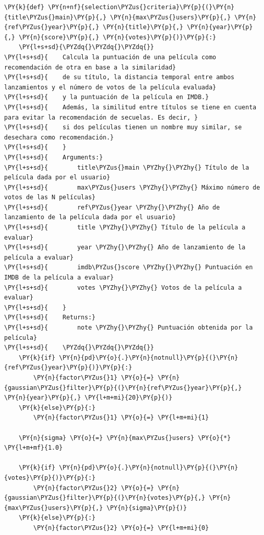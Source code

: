     \begin{tcolorbox}[breakable, size=fbox, boxrule=1pt, pad at break*=1mm,colback=cellbackground, colframe=cellborder]
\begin{Verbatim}[commandchars=\\\{\}]
\PY{k}{def} \PY{n+nf}{selection\PYZus{}criteria}\PY{p}{(}\PY{n}{title\PYZus{}main}\PY{p}{,} \PY{n}{max\PYZus{}users}\PY{p}{,} \PY{n}{ref\PYZus{}year}\PY{p}{,} \PY{n}{title}\PY{p}{,} \PY{n}{year}\PY{p}{,} \PY{n}{score}\PY{p}{,} \PY{n}{votes}\PY{p}{)}\PY{p}{:}
    \PY{l+s+sd}{\PYZdq{}\PYZdq{}\PYZdq{}}
\PY{l+s+sd}{    Calcula la puntuación de una película como recomendación de otra en base a la similaridad}
\PY{l+s+sd}{    de su título, la distancia temporal entre ambos lanzamientos y el número de votos de la película evaluada}
\PY{l+s+sd}{    y la puntuación de la película en IMDB.}
\PY{l+s+sd}{    Además, la similitud entre títulos se tiene en cuenta para evitar la recomendación de secuelas. Es decir, }
\PY{l+s+sd}{    si dos películas tienen un nombre muy similar, se desechara como recomendación.}
\PY{l+s+sd}{    }
\PY{l+s+sd}{    Arguments:}
\PY{l+s+sd}{        title\PYZus{}main \PYZhy{}\PYZhy{} Título de la película dada por el usuario}
\PY{l+s+sd}{        max\PYZus{}users \PYZhy{}\PYZhy{} Máximo número de votos de las N películas}
\PY{l+s+sd}{        ref\PYZus{}year \PYZhy{}\PYZhy{} Año de lanzamiento de la película dada por el usuario}
\PY{l+s+sd}{        title \PYZhy{}\PYZhy{} Título de la película a evaluar}
\PY{l+s+sd}{        year \PYZhy{}\PYZhy{} Año de lanzamiento de la película a evaluar}
\PY{l+s+sd}{        imdb\PYZus{}score \PYZhy{}\PYZhy{} Puntuación en IMDB de la película a evaluar}
\PY{l+s+sd}{        votes \PYZhy{}\PYZhy{} Votos de la película a evaluar}
\PY{l+s+sd}{    }
\PY{l+s+sd}{    Returns:}
\PY{l+s+sd}{        note \PYZhy{}\PYZhy{} Puntuación obtenida por la película}
\PY{l+s+sd}{    \PYZdq{}\PYZdq{}\PYZdq{}}
    \PY{k}{if} \PY{n}{pd}\PY{o}{.}\PY{n}{notnull}\PY{p}{(}\PY{n}{ref\PYZus{}year}\PY{p}{)}\PY{p}{:}
        \PY{n}{factor\PYZus{}1} \PY{o}{=} \PY{n}{gaussian\PYZus{}filter}\PY{p}{(}\PY{n}{ref\PYZus{}year}\PY{p}{,} \PY{n}{year}\PY{p}{,} \PY{l+m+mi}{20}\PY{p}{)}
    \PY{k}{else}\PY{p}{:}
        \PY{n}{factor\PYZus{}1} \PY{o}{=} \PY{l+m+mi}{1}        

    \PY{n}{sigma} \PY{o}{=} \PY{n}{max\PYZus{}users} \PY{o}{*} \PY{l+m+mf}{1.0}

    \PY{k}{if} \PY{n}{pd}\PY{o}{.}\PY{n}{notnull}\PY{p}{(}\PY{n}{votes}\PY{p}{)}\PY{p}{:}
        \PY{n}{factor\PYZus{}2} \PY{o}{=} \PY{n}{gaussian\PYZus{}filter}\PY{p}{(}\PY{n}{votes}\PY{p}{,} \PY{n}{max\PYZus{}users}\PY{p}{,} \PY{n}{sigma}\PY{p}{)}
    \PY{k}{else}\PY{p}{:}
        \PY{n}{factor\PYZus{}2} \PY{o}{=} \PY{l+m+mi}{0}
        

\end{Verbatim}
\end{tcolorbox}
